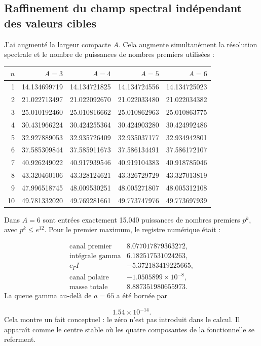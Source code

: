 \subsection{Raffinement du champ spectral indépendant des valeurs cibles}
J'ai augmenté la largeur compacte \(A\). Cela augmente simultanément la résolution spectrale et le nombre de puissances de nombres premiers utilisées :\par
{}
\begin{center}
\small
\begin{tabularx}{\textwidth}{@{}RRRRR@{}}
\toprule
\(n\) & \(A=3\) & \(A=4\) & \(A=5\) & \(A=6\) \\
 & 14.134699719 & 14.134721825 & 14.134724556 & 14.134725023 \\
2 & 21.022713497 & 21.022092670 & 21.022033480 & 21.022034382 \\
3 & 25.010192460 & 25.010816662 & 25.010862963 & 25.010863775 \\
4 & 30.431966224 & 30.424255364 & 30.424903280 & 30.424992486 \\
5 & 32.927889053 & 32.935726409 & 32.935037177 & 32.934942801 \\
6 & 37.585309844 & 37.585911673 & 37.586134491 & 37.586172107 \\
7 & 40.926249022 & 40.917939546 & 40.919104383 & 40.918785046 \\
8 & 43.320460106 & 43.328124621 & 43.326729729 & 43.327013819 \\
9 & 47.996518745 & 48.009530251 & 48.005271807 & 48.005312108 \\
10 & 49.781332020 & 49.769281661 & 49.773747976 & 49.773697939 \\
\bottomrule
\end{tabularx}
\end{center}
Dans \(A=6\) sont entrées exactement 15.040 puissances de nombres premiers \(p^k\), avec \(p^k\leq e^{12}\). Pour le premier maximum, le registre numérique était :\par
\[
\begin{array}{lr}
\text{canal premier} & 8.077017879363272,\\
\text{intégrale gamma} & 6.182517531024263,\\
c_\Gamma I & -5.372183419225665,\\
\text{canal polaire} & -1.0505899\times10^{-8},\\ \hline
\text{masse totale} & 8.887351980655973.
\end{array}
\]
La queue gamma au-delà de \(a=65\) a été bornée par\par
\[
1.54\times10^{-14}.
\]
Cela montre un fait conceptuel : le zéro n'est pas introduit dans le calcul. Il apparaît comme le centre stable où les quatre composantes de la fonctionnelle se referment.\par
{}
